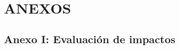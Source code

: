 \documentclass[a4paper, 12pt, spanish, twoside]{article}
\begin{document}
\clearpage










\newpage

\section*{ANEXOS} \label{sec:anexos} %

\renewcommand{\thesubsection}{\Alph{subsection}} %
\renewcommand{\thetable}{\Alph{subsection}.\arabic{table}}
\renewcommand{\thefigure}{\Alph{subsection}.\arabic{figure}}
\renewcommand{\thecode}{\Alph{subsection}.\arabic{code}}


\subsection{Anexo I: Evaluación de impactos} \label{sec:anexo1}
\end{document}
